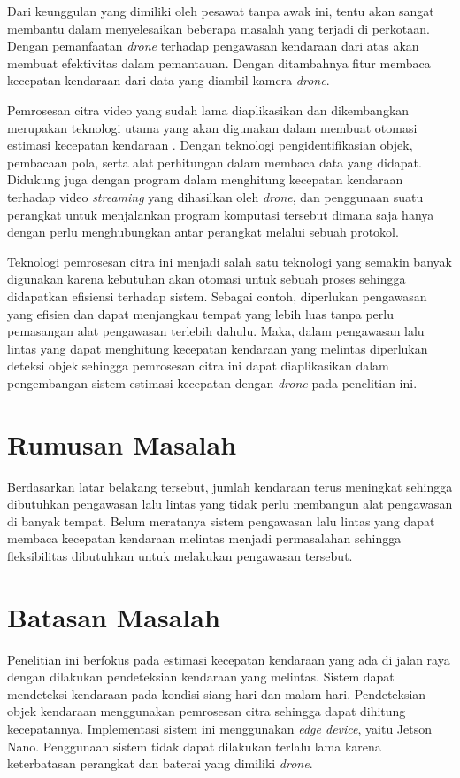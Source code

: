 Dari keunggulan yang dimiliki oleh pesawat tanpa awak ini, tentu akan sangat membantu dalam menyelesaikan beberapa masalah yang terjadi di perkotaan. Dengan pemanfaatan \emph{drone} terhadap pengawasan kendaraan dari atas akan membuat efektivitas dalam pemantauan. Dengan ditambahnya fitur membaca kecepatan kendaraan dari data yang diambil kamera \emph{drone}. 

Pemrosesan citra video yang sudah lama diaplikasikan dan dikembangkan merupakan teknologi utama yang akan digunakan dalam membuat otomasi estimasi kecepatan kendaraan \cite{Tekalp1995}. Dengan teknologi pengidentifikasian objek, pembacaan pola, serta alat perhitungan dalam membaca data yang didapat. Didukung juga dengan program dalam menghitung kecepatan kendaraan terhadap video \emph{streaming} yang dihasilkan oleh \emph{drone}, dan penggunaan suatu perangkat untuk menjalankan program komputasi tersebut dimana saja hanya dengan perlu menghubungkan antar perangkat melalui sebuah protokol.

Teknologi pemrosesan citra ini menjadi salah satu teknologi yang semakin banyak digunakan karena kebutuhan akan otomasi untuk sebuah proses sehingga didapatkan efisiensi terhadap sistem. Sebagai contoh, diperlukan pengawasan yang efisien dan dapat menjangkau tempat yang lebih luas tanpa perlu pemasangan alat pengawasan terlebih dahulu. Maka, dalam pengawasan lalu lintas yang dapat menghitung kecepatan kendaraan yang melintas diperlukan deteksi objek sehingga pemrosesan citra ini dapat diaplikasikan dalam pengembangan sistem estimasi kecepatan dengan \emph{drone} pada penelitian ini.

\section{Rumusan Masalah}
Berdasarkan latar belakang tersebut, jumlah kendaraan terus meningkat sehingga dibutuhkan pengawasan lalu lintas yang tidak perlu membangun alat pengawasan di banyak tempat. Belum meratanya sistem pengawasan lalu lintas yang dapat membaca kecepatan kendaraan melintas menjadi permasalahan sehingga fleksibilitas dibutuhkan untuk melakukan pengawasan tersebut.

\section{Batasan Masalah}
Penelitian ini berfokus pada estimasi kecepatan kendaraan yang ada di jalan raya dengan dilakukan pendeteksian kendaraan yang melintas. Sistem dapat mendeteksi kendaraan pada kondisi siang hari dan malam hari. Pendeteksian objek kendaraan menggunakan pemrosesan citra sehingga dapat dihitung kecepatannya. Implementasi sistem ini menggunakan \emph{edge device}, yaitu Jetson Nano. Penggunaan sistem tidak dapat dilakukan terlalu lama karena keterbatasan perangkat dan baterai yang dimiliki \emph{drone}.

